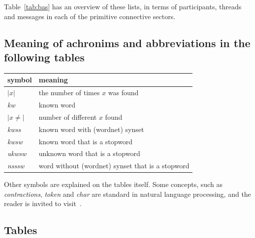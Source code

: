 \documentclass[%
 aip,
 jmp,%
 amsmath,amssymb,
 reprint,%
]{revtex4-1}
\begin{document}
Table~\ref{tab:bas} has an overview of these lists, in terms of participants, threads and messages in each of the primitive connective sectors.

\subsection{Meaning of achronims and abbreviations in the following tables}

\begin{table}[H]
\centering
\begin{tabular}{|p{1cm}|p{6cm}|}\hline
symbol & meaning \\\hline\hline
$|x|$ & the number of times $x$ was found \\\hline
\emph{kw} & known word \\\hline
$|x\neq|$ & number of different $x$ found \\\hline
\emph{kwss} & known word with (wordnet) synset \\\hline
\emph{kwsw} & known word that is a stopword \\\hline
\emph{ukwsw} & unknown word that is a stopword \\\hline
\emph{nsssw} & word without (wordnet) synset that is a stopword \\\hline
\end{tabular}
\end{table}

Other symbols are explained on the tables itself. Some concepts, such as \emph{contractions}, \emph{token} and \emph{char} are standard in natural language processing, and the reader is invited to visit~\cite{nltkBook}.

\subsection{Tables}
\end{document}
